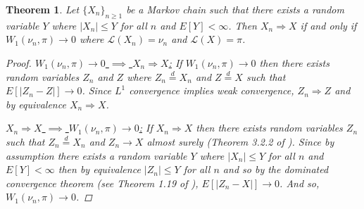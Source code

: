 \documentclass{article}
\theoremstyle{plain}%
\newtheorem{theorem}{Theorem}[section]
\theoremstyle{definition}
\theoremstyle{remark}
\begin{document}
	
	\begin{theorem}
		Let $\{X_n\}_{n\geq 1}$ be a Markov chain such that there exists a random variable $Y$ where $|X_n|\leq Y$ for all $n$ and $E[Y]<\infty$. Then $X_n\Rightarrow X$ if and only if $W_1(\nu_n, \pi )\to 0$ where $\mathcal{L}(X_n)=\nu_n$ and $\mathcal{L}(X)=\pi$.
		\begin{proof}
			\underline{$W_1(\nu_n, \pi )\to 0$ $\implies$ $X_n\Rightarrow X$:} If $W_1(\nu_n, \pi )\to 0$ then there exists random variables $Z_n$ and $Z$ where $Z_n \overset{d}{=} X_n$ and $Z \overset{d}{=} X$ such that $E[|Z_n-Z|]\to 0$. Since $L^1$ convergence implies weak convergence, $Z_n\Rightarrow Z$ and by equivalence $X_n\Rightarrow X$. 
			
			\underline{ $X_n\Rightarrow X$ $\implies$  $W_1(\nu_n, \pi )\to 0$:} If $X_n\Rightarrow X$ then there exists random variables $Z_n$ such that $Z_n \overset{d}{=} X_n$ and  $Z_n\to X$ almost surely (Theorem 3.2.2 of \cite{durrett}). Since by assumption there exists a random variable $Y$ where $|X_n|\leq Y$ for all $n$ and $E[Y]<\infty$ then by equivalence $|Z_n|\leq Y$ for all $n$ and so by the dominated convergence theorem (see Theorem 1.19 of \cite{levans}), $E[|Z_n-X|]\to 0$. And so, $W_1(\nu_n, \pi )\to 0$.
		\end{proof}
	\end{theorem}
	
\end{document}
